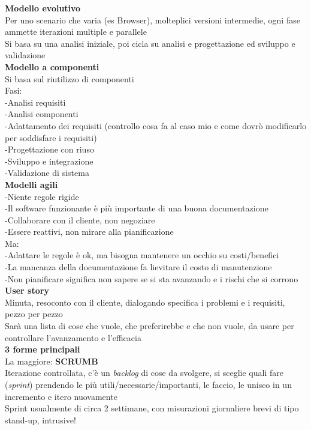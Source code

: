 \documentclass{article}
\begin{document}
		\textbf{Modello evolutivo}\\
		Per uno scenario che varia (es Browser), molteplici versioni intermedie, ogni fase ammette iterazioni multiple e parallele\\
		Si basa su una analisi iniziale, poi cicla su analisi e progettazione ed sviluppo e validazione\\
		
		\textbf{Modello a componenti}\\
		Si basa sul riutilizzo di componenti\\
		Fasi:\\
		-Analisi requisiti\\
		-Analisi componenti\\
		-Adattamento dei requisiti (controllo cosa fa al caso mio e come dovrò modificarlo per soddisfare i requisiti)\\
		-Progettazione con riuso\\
		-Sviluppo e integrazione\\
		-Validazione di sistema\\
		
		\textbf{Modelli agili}\\
		-Niente regole rigide\\
		-Il software funzionante è più importante di una buona documentazione\\
		-Collaborare con il cliente, non negoziare\\
		-Essere reattivi, non mirare alla pianificazione\\
		Ma:\\
		-Adattare le regole è ok, ma bisogna mantenere un occhio su costi/benefici\\
		-La mancanza della documentazione fa lievitare il costo di manutenzione\\
		-Non pianificare significa non sapere se si sta avanzando e i rischi che si corrono\\
		\textbf{User story}\\
		Minuta, resoconto con il cliente, dialogando specifica i problemi e i requisiti, pezzo per pezzo\\
		Sarà una lista di cose che vuole, che preferirebbe e che non vuole, da usare per controllare l'avanzamento e l'efficacia\\
		\textbf{3 forme principali}\\
		La maggiore: \textbf{SCRUMB}\\
		Iterazione controllata, c'è un \textit{backlog} di cose da svolgere, si sceglie quali fare (\textit{sprint}) prendendo le più utili/necessarie/importanti, le faccio, le unisco in un incremento e itero nuovamente\\
		Sprint usualmente di circa 2 settimane, con misurazioni giornaliere brevi di tipo stand-up, intrusive!\\
		
\end{document}
